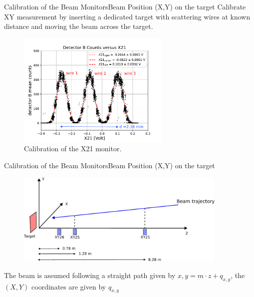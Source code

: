\documentclass[9pt,a4paper]{beamer}
\begin{document}
\begin{frame}{Calibration of the Beam Monitors}{Beam Position (X,Y) on the target}
Calibrate XY measurement by inserting a dedicated target with scattering wires at known distance and moving the beam across the target.
\begin{figure}
\includegraphics[width = 0.65\textwidth]{figures/HorizontalCalibration.pdf}
\caption{\footnotesize Calibration of the X21 monitor.}
\end{figure}
\end{frame}

\begin{frame}{Calibration of the Beam Monitors}{Beam Position (X,Y) on the target}
\begin{figure}[hbtp]
\centering
\includegraphics[width = 0.9\textwidth]{figures/scheme.pdf}
\end{figure}

The beam is assumed following a straight path given by $x,y = m\cdot z + q_{x,y}$, the $(X,Y)$ coordinates are given by $q_{x,y}$

\end{frame}
\end{document}
